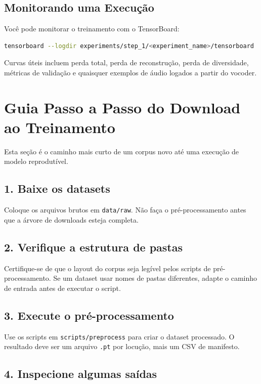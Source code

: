 \documentclass[11pt]{article}
\newcommand{\pathtt}[1]{\texttt{#1}}
\begin{document}
\subsection{Monitorando uma Execução}

Você pode monitorar o treinamento com o TensorBoard:

\begin{lstlisting}[language=bash]
tensorboard --logdir experiments/step_1/<experiment_name>/tensorboard
\end{lstlisting}

Curvas úteis incluem perda total, perda de reconstrução, perda de diversidade, métricas de validação e quaisquer exemplos de áudio logados a partir do vocoder.

\section{Guia Passo a Passo do Download ao Treinamento}

Esta seção é o caminho mais curto de um corpus novo até uma execução de modelo reprodutível.

\subsection{1. Baixe os datasets}

Coloque os arquivos brutos em \pathtt{data/raw}. Não faça o pré-processamento antes que a árvore de downloads esteja completa.

\subsection{2. Verifique a estrutura de pastas}

Certifique-se de que o layout do corpus seja legível pelos scripts de pré-processamento. Se um dataset usar nomes de pastas diferentes, adapte o caminho de entrada antes de executar o script.

\subsection{3. Execute o pré-processamento}

Use os scripts em \pathtt{scripts/preprocess} para criar o dataset processado. O resultado deve ser um arquivo \pathtt{.pt} por locução, mais um CSV de manifesto.

\subsection{4. Inspecione algumas saídas}
\end{document}
